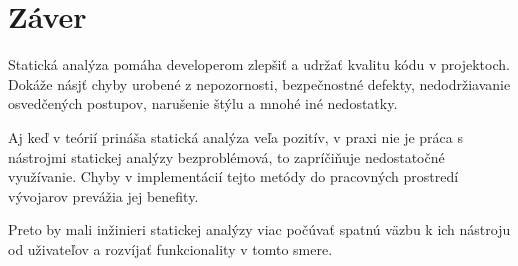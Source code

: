\documentclass[10pt,twoside,slovak,a4paper]{article}
\begin{document}
\section{Záver}
Statická analýza pomáha developerom zlepšiť a udržať kvalitu kódu v projektoch. Dokáže násjť chyby urobené z
nepozornosti, bezpečnostné defekty, nedodržiavanie osvedčených postupov, narušenie štýlu a mnohé iné nedostatky.

Aj keď v teórií prináša statická analýza veľa pozitív, v praxi nie je práca s nástrojmi statickej analýzy
bezproblémová, to zapríčiňuje nedostatočné využívanie. Chyby v implementácií tejto metódy do pracovných prostredí
vývojarov prevážia jej benefity.

Preto by mali inžinieri statickej analýzy viac počúvať spatnú väzbu k ich nástroju od uživateľov a rozvíjať
funkcionality v tomto smere.

\pagebreak


\end{document}

